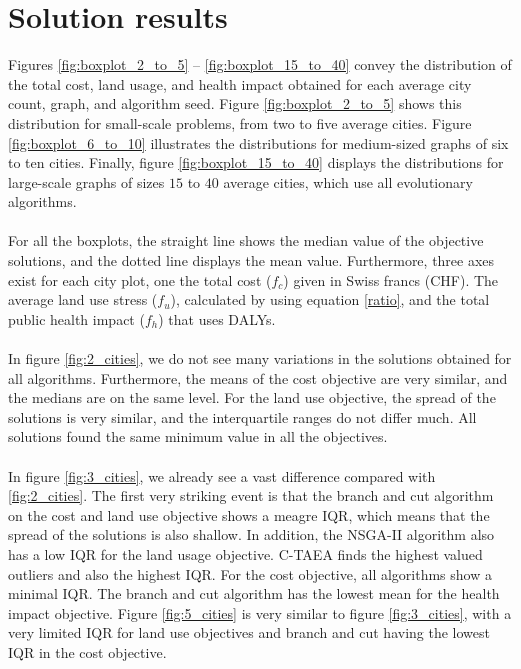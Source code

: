 \documentclass[mscthesis, 11pt]{usiinfthesis}
\theoremstyle{newdefinition}
\begin{document}
\section{Solution results}\label{sec:sol_res}
Figures \ref{fig:boxplot_2_to_5} -- \ref{fig:boxplot_15_to_40} convey the distribution of the total cost, land usage, and health impact obtained for each average city count, graph, and algorithm seed. Figure \ref{fig:boxplot_2_to_5} shows this distribution for small-scale problems, from two to five average cities. Figure \ref{fig:boxplot_6_to_10} illustrates the distributions for medium-sized graphs of six to ten cities. Finally, figure \ref{fig:boxplot_15_to_40} displays the distributions for large-scale graphs of sizes $15$ to $40$ average cities, which use all evolutionary algorithms.
\\\\
For all the boxplots, the straight line shows the median value of the objective solutions, and the dotted line displays the mean value. Furthermore, three axes exist for each city plot, one the total cost ($f_c$) given in Swiss francs (CHF). The average land use stress ($f_u$), calculated by using equation \ref{ratio}, and the total public health impact ($f_h$) that uses DALYs.
\\\\
In figure \ref{fig:2_cities}, we do not see many variations in the solutions obtained for all algorithms. Furthermore, the means of the cost objective are very similar, and the medians are on the same level. For the land use objective, the spread of the solutions is very similar, and the interquartile ranges do not differ much. All solutions found the same minimum value in all the objectives. 
\\\\
In figure \ref{fig:3_cities}, we already see a vast difference compared with \ref{fig:2_cities}. The first very striking event is that the branch and cut algorithm on the cost and land use objective shows a meagre IQR, which means that the spread of the solutions is also shallow. In addition, the NSGA-II algorithm also has a low IQR for the land usage objective. C-TAEA finds the highest valued outliers and also the highest IQR. For the cost objective, all algorithms show a minimal IQR. The branch and cut algorithm has the lowest mean for the health impact objective.
Figure \ref{fig:5_cities} is very similar to figure \ref{fig:3_cities}, with a very limited IQR for land use objectives and branch and cut having the lowest IQR in the cost objective. 
\\\\
\end{document}
